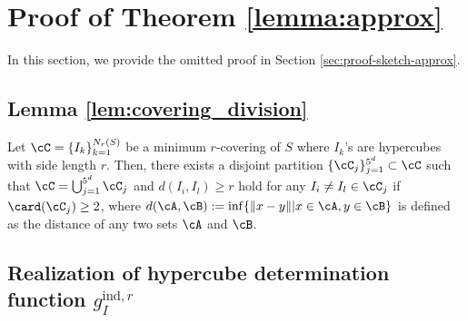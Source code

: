 \section{Proof of Theorem \ref{lemma:approx}}\label{appendix:approx}
In this section, we provide the omitted proof in Section \ref{sec:proof-sketch-approx}.


\subsection{Lemma \ref{lem:covering_division}}
\begin{lemma}\label{lem:covering_division}
    Let $\cC=\{I_k\}_{k=1}^{N_r(S)}$ be a minimum $r$-covering of $S$ where $I_k$'s are hypercubes with side length $r$.  Then, there exists a disjoint partition $\{\cC_j\}_{j=1}^{5^d} \subset \cC$ such that $\cC = \bigcup_{j=1}^{5^d} \cC_j$ and $d(I_i, I_l) \geq r$ hold for any $I_i \neq I_l \in \cC_j$ if $\card(\cC_j) \geq 2$, where $d(\cA,\cB):= \inf \{\norm{x-y} | x\in\cA,y\in\cB\}$ is defined as the distance of any two sets $\cA$ and 
    $\cB$.  %
\end{lemma}

\subsection{Realization of hypercube determination function $g_I^{\text{ind},r}$}\label{sec:realize-ind}

